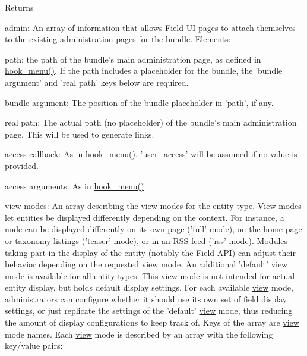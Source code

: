 \begin{DoxyReturn}{Returns}
\begin{DoxyItemize}
\begin{DoxyItemize}
\item admin: An array of information that allows Field UI pages to attach themselves to the existing administration pages for the bundle. Elements:
\begin{DoxyItemize}
\item path: the path of the bundle's main administration page, as defined in \hyperlink{group__hooks_ga5c95244fea59b25666e409759e133ded}{hook\_\-menu()}. If the path includes a placeholder for the bundle, the 'bundle argument' and 'real path' keys below are required.
\item bundle argument: The position of the bundle placeholder in 'path', if any.
\item real path: The actual path (no placeholder) of the bundle's main administration page. This will be used to generate links.
\item access callback: As in \hyperlink{group__hooks_ga5c95244fea59b25666e409759e133ded}{hook\_\-menu()}. 'user\_\-access' will be assumed if no value is provided.
\item access arguments: As in \hyperlink{group__hooks_ga5c95244fea59b25666e409759e133ded}{hook\_\-menu()}.
\end{DoxyItemize}
\end{DoxyItemize}
\item \hyperlink{classview}{view} modes: An array describing the \hyperlink{classview}{view} modes for the entity type. View modes let entities be displayed differently depending on the context. For instance, a node can be displayed differently on its own page ('full' mode), on the home page or taxonomy listings ('teaser' mode), or in an RSS feed ('rss' mode). Modules taking part in the display of the entity (notably the Field API) can adjust their behavior depending on the requested \hyperlink{classview}{view} mode. An additional 'default' \hyperlink{classview}{view} mode is available for all entity types. This \hyperlink{classview}{view} mode is not intended for actual entity display, but holds default display settings. For each available \hyperlink{classview}{view} mode, administrators can configure whether it should use its own set of field display settings, or just replicate the settings of the 'default' \hyperlink{classview}{view} mode, thus reducing the amount of display configurations to keep track of. Keys of the array are \hyperlink{classview}{view} mode names. Each \hyperlink{classview}{view} mode is described by an array with the following key/value pairs:
\begin{DoxyItemize}

\end{DoxyItemize}
\end{DoxyItemize}
\end{DoxyReturn}
